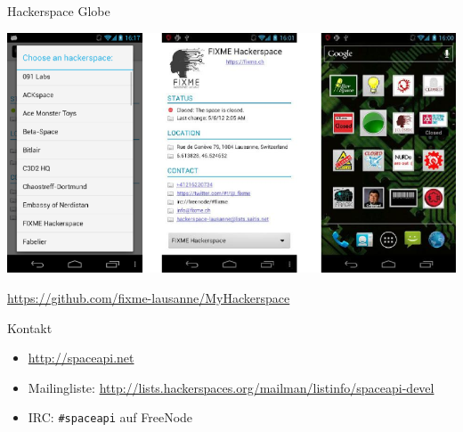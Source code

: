 \documentclass{beamer}
\begin{document}
\begin{frame}{Hackerspace Globe}
\begin{center}
\includegraphics[height=0.7\textheight]{my-hackerspace.png}

\url{https://github.com/fixme-lausanne/MyHackerspace}
\end{center}
\end{frame}

\begin{frame}[fragile]{Kontakt}
\begin{itemize}
	\item \url{http://spaceapi.net}
	\item Mailingliste:
		\url{http://lists.hackerspaces.org/mailman/listinfo/spaceapi-devel}
	\item IRC: \texttt{\#spaceapi} auf FreeNode
\end{itemize}
\end{frame}
\end{document}
